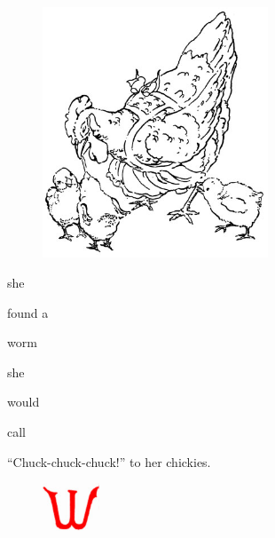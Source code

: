 \documentclass[letterpaper, 10pt, openany]{memoir}
\begin{document}
\begin{figure}
	\vspace{-2\onelineskip}
	\includegraphics[width=0.6\textwidth]{image_006.jpg}
\end{figure}

\vspace{\onelineskip}

she

\vspace{\onelineskip}

found a

\vspace{\onelineskip}

worm

\vspace{\onelineskip}

she

\vspace{\onelineskip}

would

\vspace{\onelineskip}

call

\vspace{3\onelineskip}

``Chuck-chuck-chuck!'' to her chickies.

\newpage
\begin{figure}
	\includegraphics[width=0.15\textwidth]{image_007_1.jpg}
\end{figure}
\end{document}
